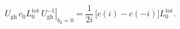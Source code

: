 \begin{equation}
\left.U_{\text{gh}}\, c_0 L^{\text{tot}}_0\, U^{-1}_{\text{gh}}
\right|_{b_0=0}
=\frac{1}{2i}\,\bigl[c(i)-c(-i)\bigr]L_0^{\text{tot}}.
\end{equation}

